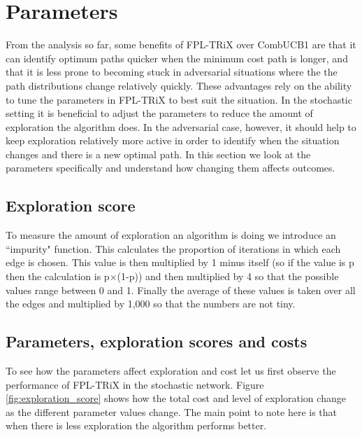 
\section{Parameters}

From the analysis so far, some benefits of FPL-TRiX over CombUCB1 are that it can identify optimum paths quicker when the minimum cost path is longer, and that it is less prone to becoming stuck in adversarial situations where the the path distributions change relatively quickly. These advantages rely on the ability to tune the parameters in FPL-TRiX to best suit the situation. In the stochastic setting it is beneficial to adjust the parameters to reduce the amount of exploration the algorithm does. In the adversarial case, however, it should help to keep exploration relatively more active in order to identify when the situation changes and there is a new optimal path. In this section we look at the parameters specifically and understand how changing them affects outcomes.\\

\subsection{Exploration score}

To measure the amount of exploration an algorithm is doing we introduce an ``impurity" function. This calculates the proportion of iterations in which each edge is chosen. This value is then multiplied by 1 minus itself (so if the value is p then the calculation is p$\times$(1-p)) and then multiplied by 4 so that the possible values range between 0 and 1. Finally the average of these values is taken over all the edges and multiplied by 1,000 so that the numbers are not tiny.\\

\subsection{Parameters, exploration scores and costs}

To see how the parameters affect exploration and cost let us first observe the performance of FPL-TRiX in the stochastic network. Figure \ref{fig:exploration_score} shows how the total cost and level of exploration change as the different parameter values change. The main point to note here is that when there is less exploration the algorithm performs better.\\

